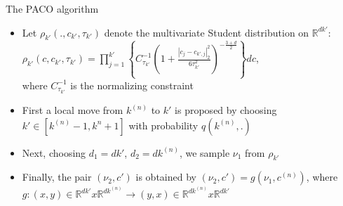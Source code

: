 \documentclass[10pt]{beamer}
\begin{document}
\begin{frame}[fragile]{The PACO algorithm}
\begin{itemize}
\item Let $\rho_{k'}(., c_{k'}, \tau_{k'})$ denote the multivariate Student distribution on $\mathds{R}^{dk'}$:\\

$
\rho_{k'}(c, c_{k'}, \tau_{k'}) = \prod_{j=1}^{k'} \left\{       C_{\tau_{k'}}^{-1} \left( 1+ \frac{|c_{j}-c_{k',j}|_{2}^{2}}{6\tau_{k'}^{2}}     \right)^{-\frac{3+d}{2}}  \right\}dc
$,\\
where $C_{\tau_{k'}}^{-1}$ is the normalizing constraint\\

\item First a local move from $k^{(n)}$ to $k'$ is proposed by choosing \\
$k' \in [k^{(n)}-1, k^{n}+1]$ with probability $q(k^{(n)},.)$

\item Next, choosing $d_{1} =dk'$, $d_{2}=dk^{(n)}$, we sample $\nu_{1}$ from $\rho_{k'}$

\item Finally, the pair $(\nu_{2}, c')$ is obtained by $(\nu_{2}, c') = g(\nu_{1}, c^{(n)})$, where\\
$g:(x,y)\in \mathds{R}^{dk'}x\mathds{R}^{dk^{(n)}} \rightarrow (y,x) \in \mathds{R}^{dk^{(n)}}x\mathds{R}^{dk'}$


\end{itemize}
\end{frame}
\end{document}
